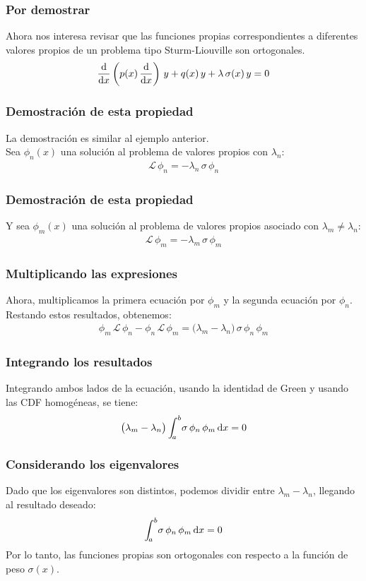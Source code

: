 \documentclass[12pt]{beamer}
\begin{document}
\begin{frame}
\frametitle{Por demostrar}
Ahora nos interesa revisar que las funciones propias correspondientes a diferentes valores propios de un problema tipo Sturm-Liouville son ortogonales.
\pause
\begin{align*}
\dv{x} \left( p(x) \, \dv{x} \right) \, y + q(x) \, y + \lambda \, \sigma (x) \, y = 0
\end{align*}
\end{frame}
\begin{frame}
\frametitle{Demostración de esta propiedad}
La demostración es similar al ejemplo anterior.
\\
\bigskip
\pause
Sea $\phi_{n}(x)$ una solución al problema de valores propios con $\lambda_{n}$:
\pause
\begin{align*}
\mathcal{L} \, \phi_{n} = - \lambda_{n} \, \sigma \, \phi_{n}
\end{align*}
\end{frame}
\begin{frame}
\frametitle{Demostración de esta propiedad}
Y sea $\phi_{m}(x)$ una solución al problema de valores propios asociado con $\lambda_{m} \neq \lambda_{n}$:
\pause
\begin{align*}
\mathcal{L} \, \phi_{m} = - \lambda_{m} \, \sigma \, \phi_{m}
\end{align*}
\end{frame}
\begin{frame}
\frametitle{Multiplicando las expresiones}
Ahora, multiplicamos la primera ecuación por $\phi_{m}$ y la segunda ecuación por $\phi_{n}$. \pause Restando estos resultados, obtenemos:
\pause
\begin{align*}
\phi_{m}\, \mathcal{L} \, \phi_{n} - \phi_{n} \, \mathcal{L} \, \phi_{m} = \big( \lambda_{m} - \lambda_{n} \big) \, \sigma \, \phi_{n} \, \phi_{m}
\end{align*}
\end{frame}
\begin{frame}
\frametitle{Integrando los resultados}
Integrando ambos lados de la ecuación, usando la identidad de Green y usando las CDF homogéneas, se tiene:
\pause
\begin{align*}
\big( \lambda_{m} - \lambda_{n} \big) \, \scaleint{5ex}_{\bs a}^{b} \sigma \, \phi_{n} \, \phi_{m} \dd{x} = 0
\end{align*}
\end{frame}
\begin{frame}
\frametitle{Considerando los eigenvalores}
Dado que los eigenvalores son distintos, podemos dividir entre $\lambda_{m} - \lambda_{n}$, llegando al resultado deseado:
\pause
\begin{align*}
\scaleint{5ex}_{\bs a}^{b} \sigma \, \phi_{n} \, \phi_{m} \dd{x} = 0
\end{align*}
Por lo tanto, las funciones propias son ortogonales con respecto a la función de peso $\sigma(x)$.
\end{frame}
\end{document}
